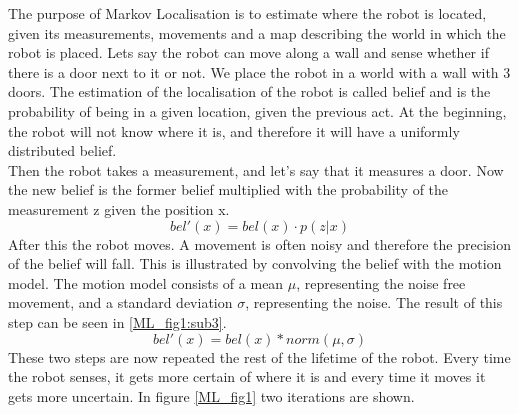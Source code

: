 The purpose of Markov Localisation is to estimate where the robot is located, given its measurements, movements and a map describing the world in which the robot is placed.
Lets say the robot can move along a wall and sense whether if there is a door next to it or not. We place the robot in a world with a wall with 3 doors.
The estimation of the localisation of the robot is called belief and is the probability of being in a given location, given the previous act. At the beginning, the robot will not know where it is, and therefore it will have a uniformly distributed belief.\\ 
Then the robot takes a measurement, and let's say that it measures a door. Now the new belief is the former belief multiplied with the probability of the measurement z given the position x. 
\begin{equation}
bel'(x) = bel(x) \cdot p(z|x)
\label{ML_eq1}
\end{equation}
After this the robot moves. A movement is often noisy and therefore the precision of the belief will fall. This is illustrated by convolving the belief with the motion model. The motion model consists of a mean $\mu$, representing the noise free movement, and a standard deviation $\sigma$, representing the noise. The result of this step can be seen in \ref{ML_fig1:sub3}.
\begin{equation}
bel'(x) = bel(x) \ast norm(\mu,\sigma)
\label{ML_eq2}
\end{equation}
These two steps are now repeated the rest of the lifetime of the robot. Every time the robot senses, it gets more certain of where it is and every time it moves it gets more uncertain. In figure \ref{ML_fig1} two iterations are shown.

